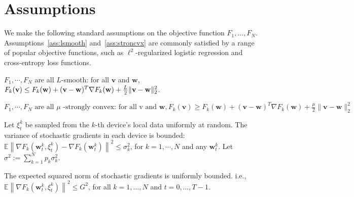 
\section{Assumptions}
\label{sec:assumptions}
We make the following standard assumptions on the objective function $F_1,\dots, F_N$. Assumptions~\ref{ass:lsmooth} and~\ref{ass:stroncvx} are commonly satisfied by a range of popular objective functions, such as $\ell^{2}$-regularized logistic regression and cross-entropy loss functions.


\begin{assumption}[$L$-smooth]
	$F_{1}, \cdots, F_{N}$ are all $L$-smooth: for all  $\mathbf{v}$  and $\mathbf{w}$, $F_{k}(\mathbf{v}) \leq F_{k}(\mathbf{w})+(\mathbf{v}- \\ \mathbf{w})^{T} \nabla F_{k}(\mathbf{w})+\frac{L}{2}\|\mathbf{v}-\mathbf{w}\|_{2}^{2}$.
	\label{ass:lsmooth}
\end{assumption}
\begin{assumption}
	$	F_{1}, \cdots, F_{N} \text { are all } \mu \text { -strongly convex: for all v and } \mathbf{w}, F_{k}(\mathbf{v}) \geq F_{k}(\mathbf{w})+(\mathbf{v}-\mathbf{w})^{T} \nabla F_{k}(\mathbf{w})+\frac{\mu}{2}\|\mathbf{v}-\mathbf{w}\|_{2}^{2}$
	\label{ass:stroncvx}
\end{assumption}
\begin{assumption}
	Let $\xi_{t}^{k}$ be sampled from the $k$-th device's local data uniformly at random. The variance of stochastic gradients in each device is bounded: $\mathbb{E}\left\|\nabla F_{k}\left(\mathbf{w}_{t}^{k}, \xi_{t}^{k}\right)-\nabla F_{k}\left(\mathbf{w}_{t}^{k}\right)\right\|^{2} \leq \sigma_{k}^{2}$,
	for $k=1, \cdots, N$ and any $\mathbf{w}_{t}^{k}$. Let $\sigma^2:=\sum_{k=1}^{N}p_k\sigma_{k}^{2}$.
	\label{ass:boundedvariance}
\end{assumption}
\begin{assumption}
	The expected squared norm of stochastic gradients is uniformly bounded. i.e.,
	$\mathbb{E}\left\|\nabla F_{k}\left(\mathbf{w}_{t}^{k}, \xi_{t}^{k}\right)\right\|^{2} \leq G^{2}$, for all $k = 1,..., N$ and $t=0, \dots, T-1$.
	\label{ass:subgrad2}
\end{assumption}
